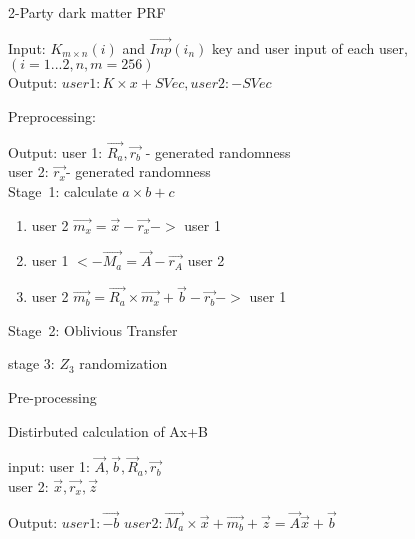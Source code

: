 \begin{algorithm}
\caption{2-Party dark matter PRF}
\label{2PartyDarkMatter}
	

	Input: ${K_{m\times n} }(i)$ and $\vec{Inp}(i_n)$ key and user input of each user,\\
	$(i = 1...2, n,m = 256)$\\ 
	Output: $user 1: K \times x + SVec, user2: -SVec$\\   %
	
		\begin{algorithmic}
			
\STATE Preprocessing:

		Output: 	user 1: $\vec{R_a}, \vec{r_b}$ - generated randomness \\
						 user 2: $\vec{r_x} $- generated randomness \\

\STATE Stage\ 1: calculate $a \times b \plus c$

	          	\begin{enumerate}
	
	\item user 2 $\vec{m_x} = \vec{x} -\vec{r_x}  ->  $  user 1
	
	\item user 1  $ <-   \vec{M_a} =  \vec{A} - \vec{r_A}   $ user 2
	
	\item user 2 $ \vec{m_b} = \vec{R_a} \times \vec{m_x} + \vec{b}  - \vec{r_b}  -> $ user 1
\end{enumerate}


\STATE Stage\ 2: Oblivious Transfer

\STATE stage 3: $Z_3$ randomization  

\end{algorithmic}

\end{algorithm}

\begin{algorithm}
	\caption{Pre-processing}

\end{algorithm}


\begin{algorithm}
\caption{Distirbuted calculation of Ax+B}
	
	input: user 1: ${\vec{A}, \vec{b}, {\vec R_a}, \vec{r_b} } $ \\
	          user 2: ${\vec{x}, \vec{r_x},  \vec{z} }$
	          

	          
	Output: $user 1: \vec{-b} $
				 $user 2: \vec{M_a} \times \vec{x} + \vec{m_b} + \vec{z} = \vec{A} \vec{x} + \vec{b}$

\end{algorithm}

